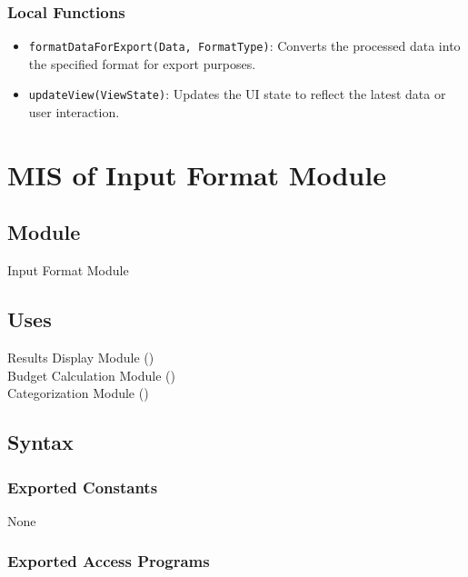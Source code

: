 \documentclass[12pt, titlepage]{article}
\begin{document}
\subsubsection{Local Functions}

\begin{itemize}
    \item \texttt{formatDataForExport(Data, FormatType)}: Converts the processed data into the specified format for export purposes.
    \item \texttt{updateView(ViewState)}: Updates the UI state to reflect the latest data or user interaction.
\end{itemize}

\newpage


\section{MIS of Input Format Module}\label{input_format_module}

\subsection{Module}

Input Format Module

\subsection{Uses}

Results Display Module ()\\
Budget Calculation Module ()\\
Categorization Module ()\\

\subsection{Syntax}

\subsubsection{Exported Constants}

None

\subsubsection{Exported Access Programs}
\end{document}
